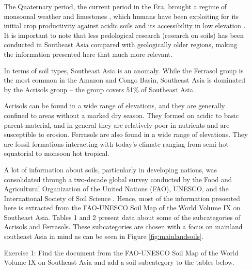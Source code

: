 The Quaternary period, the current period in the Era, brought a regime of monsoonal weather and limestones \citep{verstappen1997effect}, which humans have been exploiting for its initial crop productivity against acidic soils and its accessibility in low elevation \citep{asio2006morphology}. It is important to note that less pedological research (research on soils) has been conducted in Southeast Asia compared with geologically older regions, making the information presented here that much more relevant. 

In terms of soil types, Southeast Asia is an anomaly. While the Ferrasol group is the most common in the Amazon and Congo Basin, Southeast Asia is dominated by the Acrisols group \citep{kyuma1966major} -- the group covers 51\% of Southeast Asia. 

Acrisols can be found in a wide range of elevations, and they are generally confined to areas without a marked dry season. They formed on acidic to basic parent material, and in general they are relatively poor in nutrients and are susceptible to erosion. Ferrasols are also found in a wide range of elevations. They are fossil formations interacting with today's climate ranging from semi-hot equatorial to monsoon hot tropical. 

A lot of information about soils, particularly in developing nations, was consolidated through a two-decade global survey conducted by the Food and Agricultural Organization of the United Nations (FAO), UNESCO, and the International Society of Soil Science \citep{dudal2005soils}. Hence, most of the information presented here is extracted from the FAO-UNESCO Soil Map of the World Volume IX on Southeast Asia. Tables 1 and 2 present data about some of the subcategories of Acrisols and Ferrasols. These subcategories are chosen with a focus on mainland southeast Asia in mind as can be seen in Figure \ref{fig:mainlandsoils}.

Exercise 1: Find the document from the FAO-UNESCO Soil Map of the World Volume IX on Southeast Asia and add a soil subcategory to the tables below.

